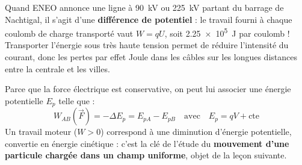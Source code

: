 \documentclass[11pt]{article}
\newcommand{\cle}[1]{{\popxbold\color{popdark}#1}}
\begin{document}
\begin{savaistu}
Quand ENEO annonce une ligne à \SI{90}{kV} ou \SI{225}{kV} partant du barrage de Nachtigal, il s'agit d'une \textbf{différence de potentiel} : le travail fourni à chaque coulomb de charge transporté vaut $W = qU$, soit \SI{2,25e5}{J} par coulomb ! Transporter l'énergie sous très haute tension permet de réduire l'intensité du courant, donc les pertes par effet Joule dans les câbles sur les longues distances entre la centrale et les villes.
\end{savaistu}

\begin{aretenir}
Parce que la force électrique est conservative, on peut lui associer une \cle{énergie potentielle} $E_p$ telle que :
\[ W_{AB}(\vec{F}) = -\Delta E_p = E_{pA} - E_{pB} \quad\text{avec}\quad E_p = qV + \text{cte} \]
Un travail moteur ($W>0$) correspond à une diminution d'énergie potentielle, convertie en énergie cinétique : c'est la clé de l'étude du \textbf{mouvement d'une particule chargée dans un champ uniforme}, objet de la leçon suivante.
\end{aretenir}
\end{document}
